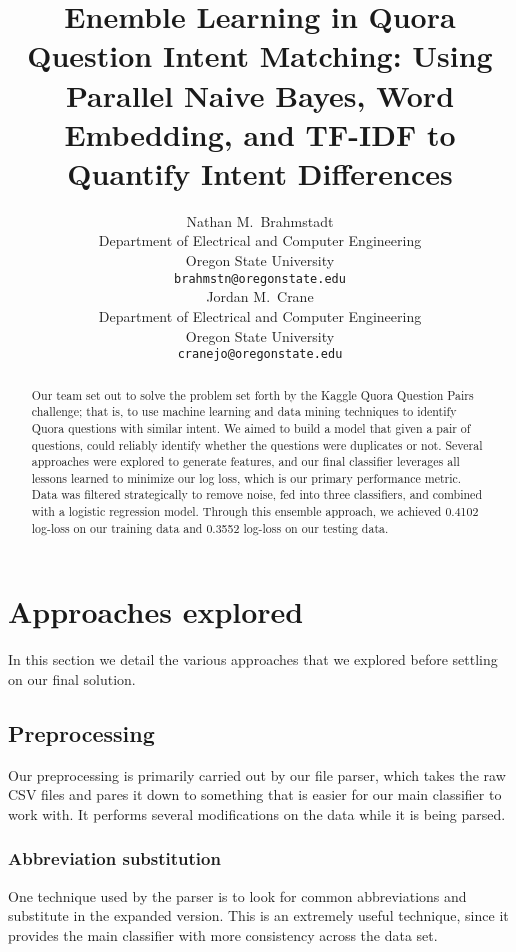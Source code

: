 \documentclass{article}
\title{Enemble Learning in Quora Question Intent Matching:
Using Parallel Naive Bayes, Word Embedding, and TF-IDF to Quantify Intent Differences}
\author{
  Nathan M.~Brahmstadt \\
  Department of Electrical and Computer Engineering\\
  Oregon State University\\
  \texttt{brahmstn@oregonstate.edu} \\
  \And
  Jordan M.~Crane \\
  Department of Electrical and Computer Engineering \\
  Oregon State University \\
  \texttt{cranejo@oregonstate.edu} \\
}
\begin{document}

\maketitle

\begin{abstract}
	Our team set out to solve the problem set forth by the Kaggle Quora Question
    Pairs challenge; that is, to use machine learning and data mining techniques
    to identify Quora questions with similar intent. We aimed to build a model
    that given a pair of questions, could reliably identify whether the
    questions were duplicates or not. Several approaches were explored to generate 
	features, and our final classifier leverages all lessons learned to minimize our log loss, 
	which is our primary performance metric. Data was filtered 
    strategically to remove noise, fed into three classifiers, 
    and combined with a logistic regression model. Through this ensemble approach, we 
    achieved 0.4102 log-loss on our training data and 0.3552 log-loss on our testing data.

\end{abstract}

\section{Approaches explored}

In this section we detail the various approaches that we explored before
settling on our final solution.

\subsection{Preprocessing}

Our preprocessing is primarily carried out by our file parser, which takes the
raw CSV files and pares it down to something that is easier for our main
classifier to work with. It performs several modifications on the data while it
is being parsed.

\subsubsection{Abbreviation substitution}

One technique used by the parser is to look for common abbreviations and
substitute in the expanded version. This is an extremely useful technique, since
it provides the main classifier with more consistency across the data set.
\end{document}

